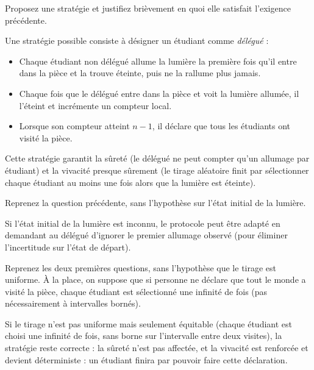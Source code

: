 \begin{exercice}
  \begin{question}
  \item Proposez une stratégie et justifiez brièvement en quoi elle satisfait l'exigence précédente.
  \end{question}
  \begin{correction}
    Une stratégie possible consiste à désigner un étudiant comme \emph{délégué} :
    \begin{itemize}
    \item Chaque étudiant non délégué allume la lumière la première fois qu'il entre
      dans la pièce et la trouve éteinte, puis ne la rallume plus jamais.
    \item Chaque fois que le délégué entre dans la pièce et voit la lumière allumée,
      il l'éteint et incrémente un compteur local.
    \item Lorsque son compteur atteint $n-1$, il déclare que tous les étudiants ont visité la pièce.
    \end{itemize}
    Cette stratégie garantit la sûreté (le délégué ne peut compter qu'un allumage par étudiant)
    et la vivacité presque sûrement (le tirage aléatoire finit par sélectionner chaque étudiant
    au moins une fois alors que la lumière est éteinte).
  \end{correction}
  
  \begin{question}
  \item Reprenez la question précédente, sans l'hypothèse sur l'état initial de la lumière.
  \end{question}
  \begin{correction}
    Si l'état initial de la lumière est inconnu,
    le protocole peut être adapté en demandant au délégué d'ignorer le premier allumage observé
    (pour éliminer l'incertitude sur l'état de départ).
  \end{correction}
  
  \begin{question}
  \item Reprenez les deux premières questions, sans l'hypothèse que le tirage est uniforme. À la place, on suppose
    que si personne ne déclare que tout le monde a visité la pièce, chaque étudiant est sélectionné une infinité de fois
    (pas nécessairement à intervalles bornés). 
  \end{question}
  \begin{correction}
    Si le tirage n'est pas uniforme mais seulement équitable
    (chaque étudiant est choisi une infinité de fois, sans borne sur l'intervalle entre deux visites),
    la stratégie reste correcte : la sûreté n'est pas affectée,
    et la vivacité est renforcée et devient déterministe : un étudiant finira par pouvoir faire cette déclaration.
  \end{correction}

\end{exercice}

\endgroup
\endinput
